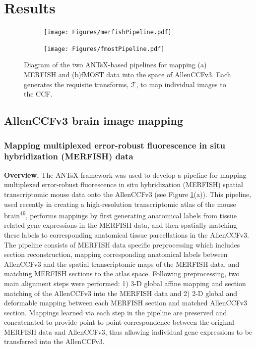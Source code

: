 \documentclass[
  12pt,
]{article}
\begin{document}
\clearpage
\newpage

\section{Results}\label{results}

\begin{figure}
\centering
\begin{subfigure}[t]{0.49\textwidth}
\centering
\texttt{[image: Figures/merfishPipeline.pdf]}
\caption{}
\end{subfigure} 
\begin{subfigure}[t]{0.49\textwidth}
\centering
\texttt{[image: Figures/fmostPipeline.pdf]}
\caption{}
\end{subfigure}
\caption{Diagram of the two ANTsX-based pipelines for mapping (a) MERFISH
          and (b)fMOST data into the space of AllenCCFv3.  Each generates
         the requisite transforms, $\mathcal{T}$, to map individual images
         to the CCF.}
\label{fig:allenpipelines}
\end{figure}

\subsection{AllenCCFv3 brain image
mapping}\label{allenccfv3-brain-image-mapping}

\subsubsection{Mapping multiplexed error-robust fluorescence in situ
hybridization (MERFISH)
data}\label{mapping-multiplexed-error-robust-fluorescence-in-situ-hybridization-merfish-data}

\textbf{Overview.} The ANTsX framework was used to develop a pipeline
for mapping multiplexed error-robust fluorescence in situ hybridization
(MERFISH) spatial transcriptomic mouse data onto the AllenCCFv3 (see
Figure \ref{fig:allenpipelines}(a)). This pipeline, used recently in
creating a high-resolution transcriptomic atlas of the mouse
brain\textsuperscript{49}, performs mappings by first generating
anatomical labels from tissue related gene expressions in the MERFISH
data, and then spatially matching these labels to corresponding
anatomical tissue parcellations in the AllenCCFv3. The pipeline consists
of MERFISH data specific preprocessing which includes section
reconstruction, mapping corresponding anatomical labels between
AllenCCFv3 and the spatial transcriptomic maps of the MERFISH data, and
matching MERFISH sections to the atlas space. Following preprocessing,
two main alignment steps were performed: 1) 3-D global affine mapping
and section matching of the AllenCCFv3 into the MERFISH data and 2) 2-D
global and deformable mapping between each MERFISH section and matched
AllenCCFv3 section. Mappings learned via each step in the pipeline are
preserved and concatenated to provide point-to-point correspondence
between the original MERFISH data and AllenCCFv3, thus allowing
individual gene expressions to be transferred into the AllenCCFv3.
\end{document}
